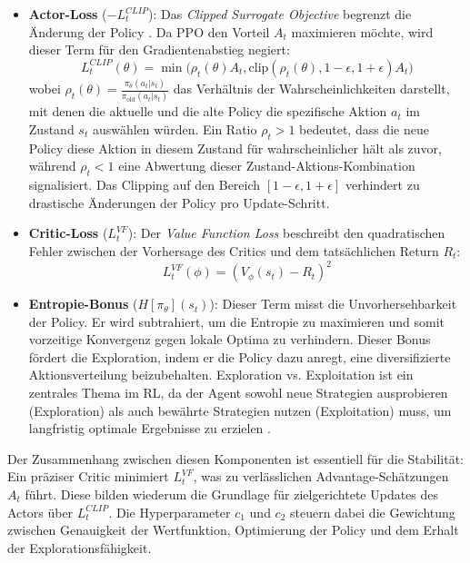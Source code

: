 \begin{itemize}
    \item \textbf{Actor\hyp{}Loss} ($-L_t^{CLIP}$): Das \textit{Clipped Surrogate Objective} begrenzt die Änderung der Policy \cite[Abschn. 3]{OriginalPPO}. Da \ac{PPO} den Vorteil $A_t$ maximieren möchte, wird dieser Term für den Gradientenabstieg negiert:
    \begin{equation}
        L_t^{CLIP}(\theta) = \min \big( \rho_t(\theta) A_t, \text{clip}(\rho_t(\theta), 1-\epsilon, 1+\epsilon) A_t \big)
        \label{eq:clip_loss}
    \end{equation}
    wobei $\rho_t(\theta) = \frac{\pi_\theta(a_t|s_t)}{\pi_{\text{old}}(a_t|s_t)}$ das Verhältnis der Wahrscheinlichkeiten darstellt, mit denen die aktuelle und die alte Policy die spezifische Aktion $a_t$ im Zustand $s_t$ auswählen würden. Ein Ratio $\rho_t > 1$ bedeutet, dass die neue Policy diese Aktion in diesem Zustand für wahrscheinlicher hält als zuvor, während $\rho_t < 1$ eine Abwertung dieser Zustand\hyp{}Aktions\hyp{}Kombination signalisiert. Das Clipping auf den Bereich $[1-\epsilon, 1+\epsilon]$ verhindert zu drastische Änderungen der Policy pro Update\hyp{}Schritt.
    
    \item \textbf{Critic\hyp{}Loss} ($L_t^{VF}$): Der \textit{Value Function Loss} beschreibt den quadratischen Fehler zwischen der Vorhersage des Critics und dem tatsächlichen Return $R_t$:
    \begin{equation}
        L_t^{VF}(\phi) = (V_\phi(s_t) - R_t)^2
        \label{eq:value_loss}
    \end{equation}

    \item \textbf{Entropie\hyp{}Bonus} ($H[\pi_\theta](s_t)$): Dieser Term misst die Unvorhersehbarkeit der Policy. Er wird subtrahiert, um die Entropie zu maximieren und somit vorzeitige Konvergenz gegen lokale Optima zu verhindern. Dieser Bonus fördert die Exploration, indem er die Policy dazu anregt, eine diversifizierte Aktionsverteilung beizubehalten. Exploration vs. Exploitation ist ein zentrales Thema im \ac{RL}, da der Agent sowohl neue Strategien ausprobieren (Exploration) als auch bewährte Strategien nutzen (Exploitation) muss, um langfristig optimale Ergebnisse zu erzielen \cite[Kap. 2]{sutton2018rl} \cite[Abschn. 5]{OriginalPPO}.
\end{itemize}

Der Zusammenhang zwischen diesen Komponenten ist essentiell für die Stabilität: Ein präziser Critic minimiert $L_t^{VF}$, was zu verlässlichen Advantage\hyp{}Schätzungen $A_t$ führt. Diese bilden wiederum die Grundlage für zielgerichtete Updates des Actors über $L_t^{CLIP}$. Die Hyperparameter $c_1$ und $c_2$ steuern dabei die Gewichtung zwischen Genauigkeit der Wertfunktion, Optimierung der Policy und dem Erhalt der Explorationsfähigkeit.

